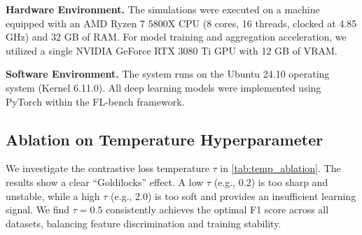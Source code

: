 \noindent\textbf{Hardware Environment.} 
The simulations were executed on a machine equipped with an AMD Ryzen 7 5800X CPU (8 cores, 16 threads, clocked at 4.85 GHz) and 32 GB of RAM. For model training and aggregation acceleration, we utilized a single NVIDIA GeForce RTX 3080 Ti GPU with 12 GB of VRAM.

\noindent\textbf{Software Environment.} 
The system runs on the Ubuntu 24.10 operating system (Kernel 6.11.0). All deep learning models were implemented using PyTorch within the FL-bench framework.

\subsection*{Ablation on Temperature Hyperparameter}
\label{sec:supp_temp_ablation}

We investigate the contrastive loss temperature $\tau$ in \cref{tab:temp_ablation}. The results show a clear ``Goldilocks'' effect. A low $\tau$ (e.g., 0.2) is too sharp and unstable, while a high $\tau$ (e.g., 2.0) is too soft and provides an insufficient learning signal. We find $\tau=0.5$ consistently achieves the optimal F1 score across all datasets, balancing feature discrimination and training stability.

